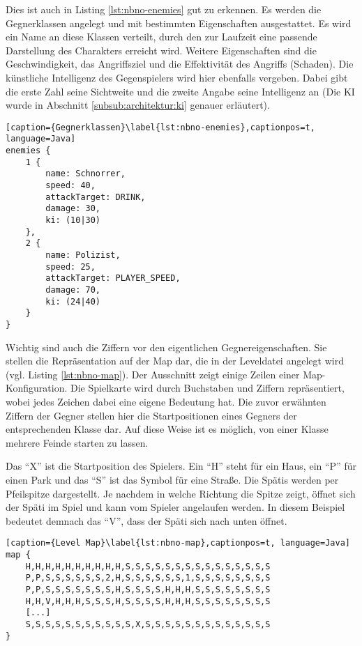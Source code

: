 Dies ist auch in Listing \ref{lst:nbno-enemies} gut zu erkennen.
Es werden die Gegnerklassen angelegt und mit bestimmten Eigenschaften ausgestattet.
Es wird ein Name an diese Klassen verteilt, durch den zur Laufzeit eine passende Darstellung des Charakters erreicht wird.
Weitere Eigenschaften sind die Geschwindigkeit, das Angriffsziel und die Effektivität des Angriffs (Schaden).
Die künstliche Intelligenz des Gegenspielers wird hier ebenfalls vergeben.
Dabei gibt die erste Zahl seine Sichtweite und die zweite Angabe seine Intelligenz an (Die KI wurde in Abschnitt \ref{subsub:architektur:ki} genauer erläutert).

\begin{lstlisting}[caption={Gegnerklassen}\label{lst:nbno-enemies},captionpos=t, language=Java]
enemies {
    1 {
        name: Schnorrer,
        speed: 40,
        attackTarget: DRINK,
        damage: 30,
        ki: (10|30)
    },
    2 {
        name: Polizist,
        speed: 25,
        attackTarget: PLAYER_SPEED,
        damage: 70,
        ki: (24|40)
    }
}
\end{lstlisting}

Wichtig sind auch die Ziffern vor den eigentlichen Gegnereigenschaften.
Sie stellen die Repräsentation auf der Map dar, die in der Leveldatei angelegt wird (vgl. Listing \ref{lst:nbno-map}). Der Ausschnitt zeigt einige Zeilen einer Map-Konfiguration. Die Spielkarte wird durch Buchstaben und Ziffern repräsentiert, wobei jedes Zeichen dabei eine eigene Bedeutung hat. Die zuvor erwähnten Ziffern der Gegner stellen hier die Startpositionen eines Gegners der entsprechenden Klasse dar. Auf diese Weise ist es möglich, von einer Klasse mehrere Feinde starten zu lassen.

Das ``X'' ist die Startposition des Spielers. Ein ``H'' steht für ein Haus, ein ``P'' für einen Park und das ``S'' ist das Symbol für eine Straße. Die Spätis werden per Pfeilspitze dargestellt. Je nachdem in welche Richtung die Spitze zeigt, öffnet sich der Späti im Spiel und kann vom Spieler angelaufen werden. In diesem Beispiel bedeutet demnach das ``V'', dass der Späti sich nach unten öffnet.

\begin{lstlisting}[caption={Level Map}\label{lst:nbno-map},captionpos=t, language=Java] 
map {
    H,H,H,H,H,H,H,H,H,H,S,S,S,S,S,S,S,S,S,S,S,S,S,S,S
    P,P,S,S,S,S,S,S,2,H,S,S,S,S,S,S,1,S,S,S,S,S,S,S,S
    P,P,S,S,S,S,S,S,S,H,S,S,S,S,H,H,H,S,S,S,S,S,S,S,S
    H,H,V,H,H,H,S,S,S,H,S,S,S,S,H,H,H,S,S,S,S,S,S,S,S
	[...]
    S,S,S,S,S,S,S,S,S,S,S,X,S,S,S,S,S,S,S,S,S,S,S,S,S
}
\end{lstlisting}

